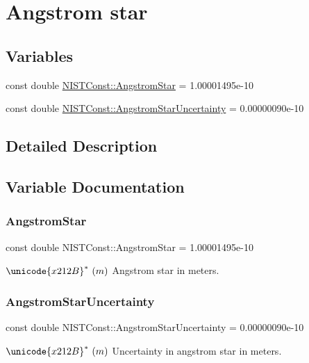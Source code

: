 \hypertarget{group___angstrom_star}{}\section{Angstrom star}
\label{group___angstrom_star}
\subsection*{Variables}
\begin{DoxyCompactItemize}
\item 
const double \hyperlink{group___angstrom_star_ga42db9558ed1ddd9706c14e4d0b0863cc}{N\+I\+S\+T\+Const\+::\+Angstrom\+Star} = 1.\+00001495e-\/10
\item 
const double \hyperlink{group___angstrom_star_ga13575debadc16e90aefbe76fdfa771a6}{N\+I\+S\+T\+Const\+::\+Angstrom\+Star\+Uncertainty} = 0.\+00000090e-\/10
\end{DoxyCompactItemize}


\subsection{Detailed Description}


\subsection{Variable Documentation}
\mbox{\label{group___angstrom_star_ga42db9558ed1ddd9706c14e4d0b0863cc}} 
\subsubsection{\texorpdfstring{Angstrom\+Star}{AngstromStar}}
{\footnotesize\ttfamily const double N\+I\+S\+T\+Const\+::\+Angstrom\+Star = 1.\+00001495e-\/10}

$\unicode{x212B}^{\ast} \ (m)$ Angstrom star in meters. \mbox{\label{group___angstrom_star_ga13575debadc16e90aefbe76fdfa771a6}} 
\subsubsection{\texorpdfstring{Angstrom\+Star\+Uncertainty}{AngstromStarUncertainty}}
{\footnotesize\ttfamily const double N\+I\+S\+T\+Const\+::\+Angstrom\+Star\+Uncertainty = 0.\+00000090e-\/10}

$\unicode{x212B}^{\ast} \ (m)$ Uncertainty in angstrom star in meters. 